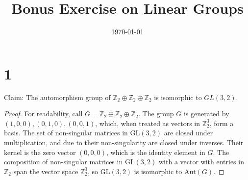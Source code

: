 \documentclass{article}
\title{\textbf{Bonus Exercise on Linear Groups}}
\date{}
\date\today
\begin{document}
\maketitle %

\thispagestyle{firstpage}
\section*{1}

Claim: The automorphism group of $\mathbb{Z}_2 \oplus \mathbb{Z}_2 \oplus \mathbb{Z}_2$ 
is isomorphic to $GL(3, 2)$.

\begin{proof}
    For readability, call $G = \mathbb{Z}_2 \oplus \mathbb{Z}_2 \oplus \mathbb{Z}_2$.  The group 
    $G$ is generated by $(1, 0, 0), (0, 1, 0), (0, 0, 1)$, which, when treated as vectors in $\mathbb{Z}_2^3$, 
    form a basis.  The set of non-singular matrices in $\mathrm{GL}(3,2)$ are closed under multiplication, and due to their non-singularity are closed under inverses.  
Their kernel is the zero vector $(0,0,0)$, which is the identity element in $G$.  The composition of non-singular matrices in $\mathrm{GL}(3,2)$ 
with a vector with entries in $\mathbb{Z}_2$ span the vector space $\mathbb{Z}_2^3$, so $\mathrm{GL}(3,2)$ is isomorphic to $\mathrm{ Aut }(G)$.
\end{proof}
\end{document}
